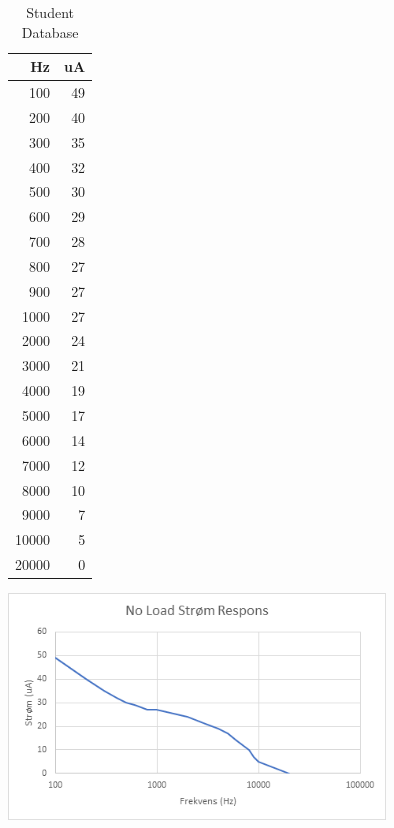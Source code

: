 \begin{table}[ht]
\begin{minipage}[b]{0.30\linewidth}
\centering
\begin{tabular}{ r |  r }
    \hline
    Hz & uA \\ \hline
    100 & 49 \\ \hline
    200 & 40 \\ \hline
    300 & 35 \\ \hline
    400 & 32 \\ \hline
    500 & 30 \\ \hline
    600 & 29 \\ \hline
    700 & 28 \\ \hline
    800 & 27 \\ \hline
    900 & 27 \\ \hline
    1000 & 27 \\ \hline
    2000 & 24 \\ \hline
    3000 & 21 \\ \hline
    4000 & 19 \\ \hline
    5000 & 17 \\ \hline
    6000 & 14 \\ \hline
    7000 & 12 \\ \hline
    8000 & 10 \\ \hline
    9000 & 7 \\ \hline
    10000 & 5 \\ \hline
    20000 & 0 \\ \hline
\end{tabular}
    \caption{Student Database}
    \label{table:student}
\end{minipage}\hfill
\begin{minipage}[b]{0.7\linewidth}
\centering
\includegraphics[width=10cm]{Figure/stromfrekvensoprindelig}
\label{fig:image}
\end{minipage}
\end{table}


